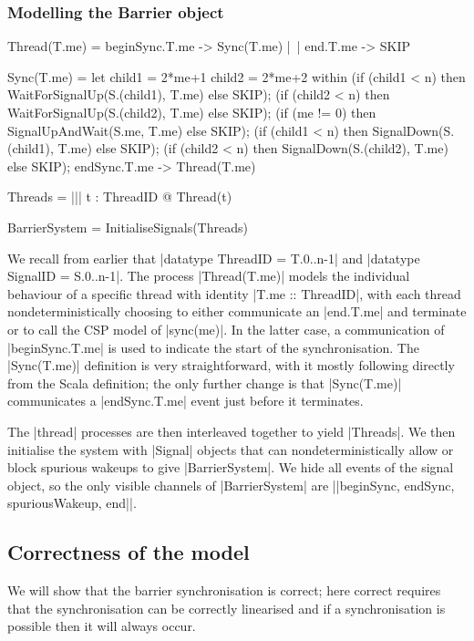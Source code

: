 \subsubsection{Modelling the Barrier object}
\inlineCSP
\begin{cspm}[caption={The CSP model of a thread interacting with the {\scalastyle Barrier} object}]
Thread(T.me) = beginSync.T.me -> Sync(T.me) |~| end.T.me -> SKIP

Sync(T.me) = 
  let child1 = 2*me+1 
      child2 = 2*me+2
  within 
      (if (child1 < n) then WaitForSignalUp(S.(child1), T.me) else SKIP);
      (if (child2 < n) then WaitForSignalUp(S.(child2), T.me) else SKIP);
      (if (me != 0) then SignalUpAndWait(S.me, T.me) else SKIP);
      (if (child1 < n) then SignalDown(S.(child1), T.me) else SKIP);
      (if (child2 < n) then SignalDown(S.(child2), T.me) else SKIP);
      endSync.T.me -> Thread(T.me)

Threads = ||| t : ThreadID @ Thread(t)

BarrierSystem = InitialiseSignals(Threads)
\end{cspm}

We recall from earlier that |datatype ThreadID = T.{0..n-1}| and |datatype SignalID = S.{0..n-1}|. The process |Thread(T.me)| models the individual behaviour of a specific thread with identity |T.me :: ThreadID|, with each thread nondeterministically choosing to either communicate an |end.T.me| and terminate or to call the CSP model of |sync(me)|. In the latter case, a communication of |beginSync.T.me| is used to indicate the start of the synchronisation. The |Sync(T.me)| definition is very straightforward, with it mostly following directly from the Scala definition; the only further change is that |Sync(T.me)| communicates a |endSync.T.me| event just before it terminates.

The |thread| processes are then interleaved together to yield |Threads|. We then initialise the system with |Signal| objects that can nondeterministically allow or block spurious wakeups to give |BarrierSystem|. We hide all events of the signal object, so the only visible channels of |BarrierSystem| are |{|beginSync, endSync, spuriousWakeup, end|}|.

\subsection{Correctness of the model}

We will show that the barrier synchronisation is correct; here correct requires that the synchronisation can be correctly linearised and if a synchronisation is possible then it will always occur. 

